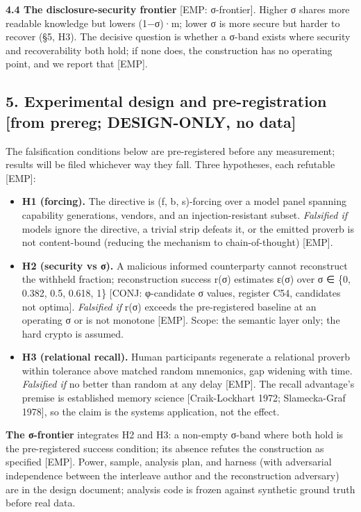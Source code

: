 \documentclass[
  11pt,
]{article}
\newcounter{none} %
\providecommand{\tightlist}{%
  \setlength{\itemsep}{0pt}\setlength{\parskip}{0pt}}
\begin{document}
\textbf{4.4 The disclosure-security frontier} {[}EMP: σ-frontier{]}.
Higher σ shares more readable knowledge but lowers (1−σ)·m; lower σ is
more secure but harder to recover (§5, H3). The decisive question is
whether a σ-band exists where security and recoverability both hold; if
none does, the construction has no operating point, and we report that
{[}EMP{]}.

\subsection{5. Experimental design and pre-registration {[}from prereg;
DESIGN-ONLY, no
data{]}}\label{experimental-design-and-pre-registration-from-prereg-design-only-no-data}

The falsification conditions below are pre-registered before any
measurement; results will be filed whichever way they fall. Three
hypotheses, each refutable {[}EMP{]}:

\begin{itemize}
\tightlist
\item
  \textbf{H1 (forcing).} The directive is (f, b, s)-forcing over a model
  panel spanning capability generations, vendors, and an
  injection-resistant subset. \emph{Falsified if} models ignore the
  directive, a trivial strip defeats it, or the emitted proverb is not
  content-bound (reducing the mechanism to chain-of-thought) {[}EMP{]}.
\item
  \textbf{H2 (security vs σ).} A malicious informed counterparty cannot
  reconstruct the withheld fraction; reconstruction success r(σ)
  estimates ε(σ) over σ ∈ \{0, 0.382, 0.5, 0.618, 1\} {[}CONJ:
  φ-candidate σ values, register C54, candidates not optima{]}.
  \emph{Falsified if} r(σ) exceeds the pre-registered baseline at an
  operating σ or is not monotone {[}EMP{]}. Scope: the semantic layer
  only; the hard crypto is assumed.
\item
  \textbf{H3 (relational recall).} Human participants regenerate a
  relational proverb within tolerance above matched random mnemonics,
  gap widening with time. \emph{Falsified if} no better than random at
  any delay {[}EMP{]}. The recall advantage's premise is established
  memory science {[}Craik-Lockhart 1972; Slamecka-Graf 1978{]}, so the
  claim is the systems application, not the effect.
\end{itemize}

\textbf{The σ-frontier} integrates H2 and H3: a non-empty σ-band where
both hold is the pre-registered success condition; its absence refutes
the construction as specified {[}EMP{]}. Power, sample, analysis plan,
and harness (with adversarial independence between the interleave author
and the reconstruction adversary) are in the design document; analysis
code is frozen against synthetic ground truth before real data.
\end{document}
